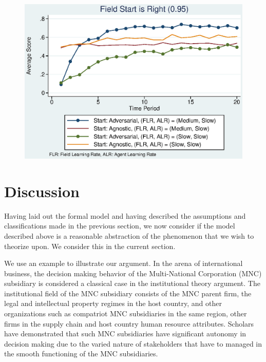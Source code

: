\documentclass[12pt,letterpaper]{article}
\begin{document}
\begin{figure}[h]
\begin{centering}
  \caption{}
  \includegraphics[width=\textwidth]{frcmedium3b}
  \label{fig:3b}
\end{centering}
\end{figure}

\section{Discussion}
Having laid out the formal model and having described the assumptions and classifications made in the previous section, we now consider if the model described above is a reasonable abstraction of the phenomenon that we wish to theorize upon. We consider this in the current section.

We use an example to illustrate our argument. In the arena of international business, the decision making behavior of the Multi-National Corporation (MNC) subsidiary is considered a classical case in the institutional theory argument. The institutional field of the MNC subsidiary consists of the MNC parent firm, the legal and intellectual property regimes in the host country, and other organizations such as compatriot MNC subsidiaries in the same region, other firms in the supply chain and host country human resource attributes. Scholars have demonstrated that such MNC subsidiaries have significant autonomy in decision making due to the varied nature of stakeholders that have to managed in the smooth functioning of the MNC subsidiaries. 
\end{document}

